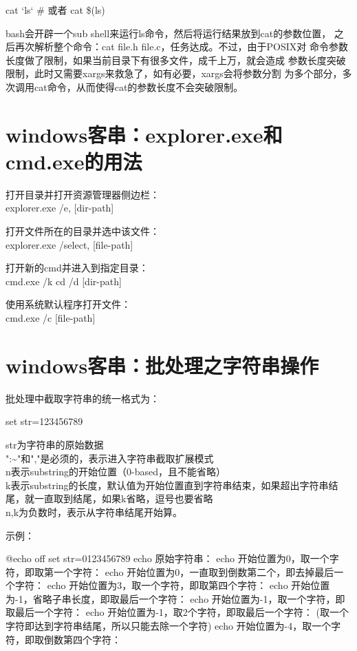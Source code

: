 ﻿\documentclass[a4paper,11pt]{article}
\begin{document}
  \begin{bashcode}
    cat `ls`
    # 或者
    cat \$(ls)
  \end{bashcode}

  bash会开辟一个sub shell来运行ls命令，然后将运行结果放到cat的参数位置，
  之后再次解析整个命令：cat file.h file.c，任务达成。不过，由于POSIX对
  命令参数长度做了限制，如果当前目录下有很多文件，成千上万，就会造成
  参数长度突破限制，此时又需要xargs来救急了，如有必要，xargs会将参数分割
  为多个部分，多次调用cat命令，从而使得cat的参数长度不会突破限制。

  \section[Windows客串：explorer.exe和cmd.exe的用法]{windows客串：explorer.exe和cmd.exe的用法}
  打开目录并打开资源管理器侧边栏：\\
  explorer.exe /e, [dir-path]

  打开文件所在的目录并选中该文件：\\
  explorer.exe /select, [file-path]

  打开新的cmd并进入到指定目录：\\
  cmd.exe /k cd /d [dir-path]

  使用系统默认程序打开文件：\\
  cmd.exe /c [file-path]

  \section[Windows客串：批处理-字符串操作]{windows客串：批处理之字符串操作}
  批处理中截取字符串的统一格式为：

  \begin{bashcode}
    set str=123456789
  \end{bashcode}

  str为字符串的原始数据\\
  ":\~{}"和","是必须的，表示进入字符串截取扩展模式\\
  n表示substring的开始位置（0-based，且不能省略）\\
  k表示substring的长度，默认值为开始位置直到字符串结束，如果超出字符串结尾，就一直取到结尾，如果k省略，逗号也要省略\\
  n,k为负数时，表示从字符串结尾开始算。


  示例：\par
  \begin{bashcode}
    @echo off
    set str=0123456789
    echo 原始字符串：%
    echo 开始位置为0，取一个字符，即取第一个字符：%
    echo 开始位置为0，一直取到倒数第二个，即去掉最后一个字符：%
    echo 开始位置为3，取一个字符，即取第四个字符：%
    echo 开始位置为-1，省略子串长度，即取最后一个字符：%
    echo 开始位置为-1，取一个字符，即取最后一个字符：%
    echo 开始位置为-1，取2个字符，即取最后一个字符：%
    (取一个字符即达到字符串结尾，所以只能去除一个字符)
    echo 开始位置为-4，取一个字符，即取倒数第四个字符：%
  \end{bashcode}
\end{document}
